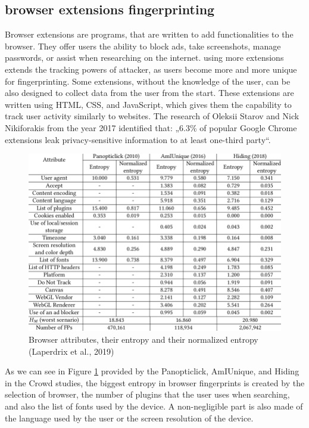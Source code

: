 \documentclass[10pt,a4paper,column]{article}
\begin{document}
\subsection{browser extensions fingerprinting}
Browser extensions are programs, that are written to add functionalities to the browser. They offer users the ability to block ads, take screenshots, manage passwords, or assist when researching on the internet\cite{carnus}. using more extensions extends the tracking powers of attacker, as users become more and more unique for fingerprinting. Some extensions, without the knowledge of the user, can be also designed to collect data from the user from the start\cite{bfautt}. These extensions are written using HTML, CSS, and JavaScript, which gives them the capability to track user activity similarly to websites\cite{FingerprintDefender}. The research of Oleksii Starov and Nick Nikiforakis\cite{Starov:powers} from the year 2017 identified that: „6.3\% of popular Google Chrome extensions leak privacy-sensitive information to at least one-third party“. 

\begin{figure}
    \centering
    \includegraphics[scale = 0.4]{Entropy.png}
    \caption{Browser attributes, their entropy and their normalized entropy \cite{table}(Laperdrix et al., 2019)}
    \label{fig:2}
\end{figure}                                                                                

As we can see in Figure \ref{fig:2} provided by the Panopticlick\cite{panopticlick}, AmIUnique\cite{amiunique}, and Hiding in the Crowd\cite{hiding} studies, the biggest entropy in browser fingerprints is created by the selection of browser, the number of plugins that the user uses when searching, and also the list of fonts used by the device. A non-negligible part is also made of the language used by the user or the screen resolution of the device.
\end{document}
